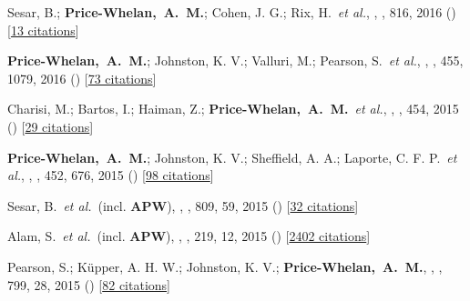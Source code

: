\item[{\color{deemph}\scriptsize21}]Sesar, B.; \textbf{Price-Whelan,~A.~M.}; Cohen, J. G.; Rix, H.~\textit{et al.}, , \apj, 816, 2016 () [\href{http://adsabs.harvard.edu/abs/2016ApJ...816L...4S}{13 citations}]

\item[{\color{deemph}\scriptsize20}]\textbf{Price-Whelan,~A.~M.}; Johnston, K. V.; Valluri, M.; Pearson, S.~\textit{et al.}, , \mnras, 455, 1079, 2016 () [\href{http://adsabs.harvard.edu/abs/2016MNRAS.455.1079P}{73 citations}]

\item[{\color{deemph}\scriptsize19}]Charisi, M.; Bartos, I.; Haiman, Z.; \textbf{Price-Whelan,~A.~M.}~\textit{et al.}, , \mnras, 454, 2015 () [\href{http://adsabs.harvard.edu/abs/2015MNRAS.454L..21C}{29 citations}]

\item[{\color{deemph}\scriptsize18}]\textbf{Price-Whelan,~A.~M.}; Johnston, K. V.; Sheffield, A. A.; Laporte, C. F. P.~\textit{et al.}, , \mnras, 452, 676, 2015 () [\href{http://adsabs.harvard.edu/abs/2015MNRAS.452..676P}{98 citations}]

\item[{\color{deemph}\scriptsize17}]Sesar, B.~\textit{et al.}~(incl. \textbf{APW}), , \apj, 809, 59, 2015 () [\href{http://adsabs.harvard.edu/abs/2015ApJ...809...59S}{32 citations}]

\item[{\color{deemph}\scriptsize16}]Alam, S.~\textit{et al.}~(incl. \textbf{APW}), , \apjs, 219, 12, 2015 () [\href{http://adsabs.harvard.edu/abs/2015ApJS..219...12A}{2402 citations}]

\item[{\color{deemph}\scriptsize15}]Pearson, S.; K{\"u}pper, A. H. W.; Johnston, K. V.; \textbf{Price-Whelan,~A.~M.}, , \apj, 799, 28, 2015 () [\href{http://adsabs.harvard.edu/abs/2015ApJ...799...28P}{82 citations}]


